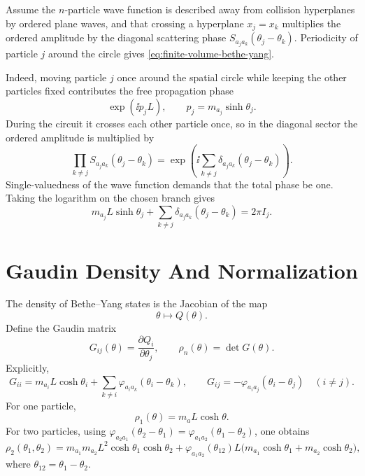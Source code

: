 \begin{construction}
\label{constr:bethe-yang-phase-around-circle}
Assume the \(n\)-particle wave function is described away from collision
hyperplanes by ordered plane waves, and that crossing a hyperplane
\(x_j=x_k\) multiplies the ordered amplitude by the diagonal scattering phase
\(S_{a_ja_k}(\theta_j-\theta_k)\).  Periodicity of particle \(j\) around the
circle gives \eqref{eq:finite-volume-bethe-yang}.
\end{construction}

Indeed, moving particle \(j\) once around the spatial circle while keeping the
other particles fixed contributes the free propagation phase
\[
  \exp(\ii p_jL),
  \qquad
  p_j=m_{a_j}\sinh\theta_j .
\]
During the circuit it crosses each other particle once, so in the diagonal
sector the ordered amplitude is multiplied by
\[
  \prod_{k\ne j}S_{a_ja_k}(\theta_j-\theta_k)
  =
  \exp\!\left(
    \ii\sum_{k\ne j}\delta_{a_ja_k}(\theta_j-\theta_k)
  \right).
\]
Single-valuedness of the wave function demands that the total phase be one.
Taking the logarithm on the chosen branch gives
\[
  m_{a_j}L\sinh\theta_j
  +
  \sum_{k\ne j}\delta_{a_ja_k}(\theta_j-\theta_k)
  =
  2\pi I_j .
\]

\section{Gaudin Density And Normalization}

The density of Bethe--Yang states is the Jacobian of the map
\[
  \theta\longmapsto Q(\theta).
\]
Define the Gaudin matrix
\begin{equation}
  G_{ij}(\theta)
  =
  \frac{\partial Q_i}{\partial\theta_j},
  \qquad
  \rho_n(\theta)=\det G(\theta).
  \label{eq:gaudin-matrix-density}
\end{equation}
Explicitly,
\[
  G_{ii}
  =
  m_{a_i}L\cosh\theta_i
  +
  \sum_{k\ne i}\varphi_{a_ia_k}(\theta_i-\theta_k),
  \qquad
  G_{ij}
  =
  -\varphi_{a_ia_j}(\theta_i-\theta_j)
  \quad (i\ne j).
\]
For one particle,
\[
  \rho_1(\theta)=m_aL\cosh\theta .
\]
For two particles, using
\(\varphi_{a_2a_1}(\theta_2-\theta_1)=
\varphi_{a_1a_2}(\theta_1-\theta_2)\), one obtains
\begin{equation}
  \rho_2(\theta_1,\theta_2)
  =
  m_{a_1}m_{a_2}L^2\cosh\theta_1\cosh\theta_2
  +
  \varphi_{a_1a_2}(\theta_{12})
  L\bigl(
    m_{a_1}\cosh\theta_1+m_{a_2}\cosh\theta_2
  \bigr),
  \label{eq:two-particle-gaudin-density}
\end{equation}
where \(\theta_{12}=\theta_1-\theta_2\).

